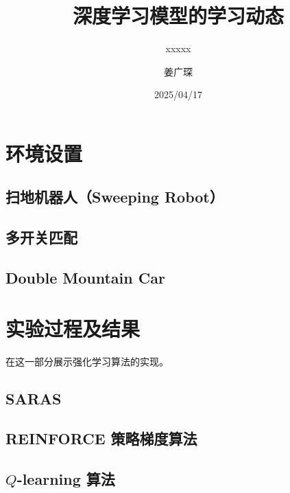 \documentclass[citestyle=gb7714-2015, bibstyle=gb7714-2015,lang=cn,14pt,scheme=chinese]{elegantbook}
\title{深度学习模型的学习动态}
\subtitle{xxxxx}
\author{姜广琛}
\institute{西北工业大学}
\date{2025/04/17}
\begin{document}
\frontmatter

\tableofcontents

\mainmatter%

\chapter{环境设置}

\section{扫地机器人（Sweeping Robot）}



\section{多开关匹配}



\section{Double Mountain Car}



\chapter{实验过程及结果}

在这一部分展示强化学习算法的实现。

\section{SARAS}



\section{REINFORCE 策略梯度算法}



\section{\(Q\)-learning 算法}
\end{document}
